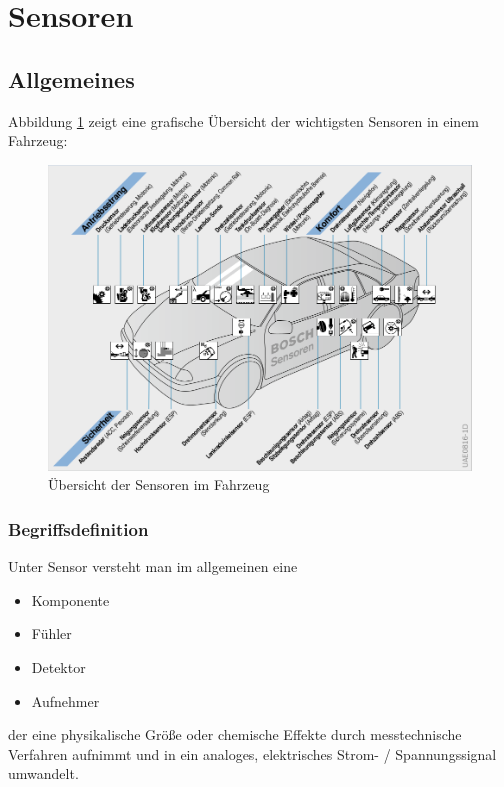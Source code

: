 \graphicspath{{./Images/Kapitel5/}}

	\section{Sensoren}
		\subsection{Allgemeines} 
		
		Abbildung \ref{fig:TS01} zeigt eine grafische Übersicht der wichtigsten Sensoren in einem Fahrzeug:
				
		\begin{figure}[h!]
			\includegraphics[width=\textwidth] {sensor_uebersicht.png}
	        \caption{Übersicht der Sensoren im Fahrzeug \cite{reif2011bosch}}
	        \label{fig:TS01}
		\end{figure}	
		
			\subsubsection{Begriffsdefinition}
		
	        Unter Sensor versteht man im allgemeinen eine
	        \begin{itemize}
	            \item Komponente
	            \item Fühler
	            \item Detektor
	            \item Aufnehmer
	        \end{itemize}
	            der eine physikalische Größe oder chemische Effekte durch messtechnische Verfahren aufnimmt und in ein analoges, elektrisches Strom- / Spannungssignal umwandelt.
	        
